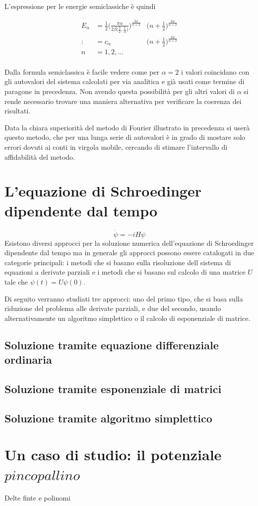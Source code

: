 \documentclass[a4paper,11pt,twoside]{article}
\begin{document}
L'espressione per le energie semiclassiche è quindi

\begin{align*}
    E_n & =
    \frac{1}{2}\Bigg(\frac{\pi\alpha}{2\beta\big(\frac{3}{2},\frac{1}{\alpha}\big)}\Bigg)^\frac{2\alpha}{\alpha+2} &\Bigg(n+\frac{1}{2}\Bigg)^\frac{2\alpha}{\alpha+2} \\
    :&= c_{\alpha} &\Bigg(n+\frac{1}{2}\Bigg)^\frac{2\alpha}{\alpha+2} \\
    n&=1,2,\dots\\
\end{align*}

Dalla formula semiclassica è facile vedere come per \(\alpha=2\) i valori coincidano con gli autovalori del sistema calcolati per via analitica e già usati come termine di paragone in precedenza. Non avendo questa possibilità per gli altri valori di \(\alpha\) si rende necessario trovare una maniera alternativa per verificare la coerenza dei risultati.

Data la chiara superiorità del metodo di Fourier illustrato in precedenza si userà questo metodo, che per una lunga serie di autovalori è in grado di mostare solo errori dovuti ai conti in virgola mobile, cercando di stimare l'intervallo di affidabilità del metodo.

\section{L'equazione di Schroedinger dipendente dal tempo}
\begin{equation}
    \dot{\psi}=-iH\psi
\end{equation}
Esistono diversi approcci per la soluzione numerica dell'equazione di Schroedinger dipendente dal tempo ma in generale gli approcci possono essere catalogati in due categorie principali: i metodi che si basano sulla risoluzione dell sistema di equazioni a derivate parziali e i metodi che si basano sul calcolo di una matrice \(U\) tale che \(\psi(t)=U\psi(0)\).

Di seguito verranno studiati tre approcci: uno del primo tipo, che si basa sulla riduzione del problema alle derivate parziali, e due del secondo, usando alternativamente un algoritmo simplettico o il calcolo di esponenziale di matrice.

\subsection{Soluzione tramite equazione differenziale ordinaria}

\subsection{Soluzione tramite esponenziale di matrici}

\subsection{Soluzione tramite algoritmo simplettico}

\section{Un caso di studio: il potenziale \(pinco pallino\)}
Delte finte e polinomi
\end{document}
